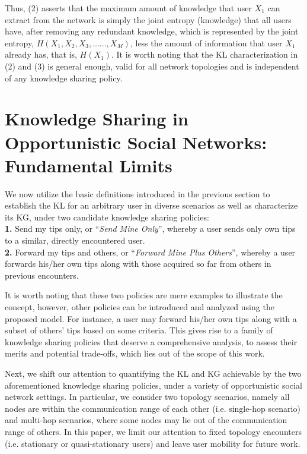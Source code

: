 \documentclass[conference]{IEEEtran}
\theoremstyle{definition}
\begin{document}
\vspace{-0.2 cm}
Thus, (2) asserts that the maximum amount of knowledge that user $X_1$ can extract from the network is simply the joint entropy (knowledge) that all users have, after removing any redundant knowledge, which is represented by the joint entropy, $H(X_1, X_2, X_3, ......, X_M)$, less the amount of information that user $X_1$ already has, that is, $H(X_1)$. It is worth noting that the KL characterization in (2) and (3) is general enough, valid for all network topologies and is independent of any knowledge sharing policy.



\vspace{-0.2 cm}
\section{Knowledge Sharing in Opportunistic Social Networks: Fundamental Limits}

We now utilize the basic definitions introduced in the previous section to establish the KL for an arbitrary user in diverse scenarios as well as characterize its KG, under two candidate knowledge sharing policies:\\
{\bf 1.} Send my tips only, or ``{\it Send Mine Only}'', whereby a user sends only own 
tips to a similar, directly encountered user.\\ 
{\bf 2.} Forward my tips and others, or ``{\it Forward Mine Plus Others}'', whereby a user forwards his/her own tips along with those acquired so far from others in previous encounters.

It is worth noting that these two policies are mere examples to illustrate the concept, however, other policies can be introduced and analyzed using the proposed model.
For instance, a user may forward his/her own tips along with a subset of others' tips based on some criteria. This gives rise to a family of knowledge sharing policies that deserve a comprehensive analysis, to assess their merits and potential trade-offs, which lies out of the scope of this work. 


Next, we shift our attention to quantifying the KL and KG achievable by the two aforementioned knowledge sharing policies, under a variety of opportunistic social network settings. In particular, we consider two topology scenarios, namely all nodes are within the communication range of each other (i.e. single-hop scenario) and multi-hop scenarios, where some nodes may lie out of the communication range of others. In this paper, we limit our attention to fixed topology encounters (i.e. stationary or quasi-stationary users) and leave user mobility for future work.
\end{document}
